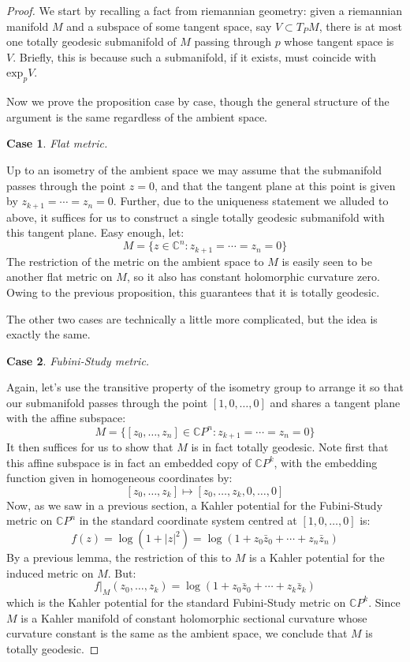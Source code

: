 \documentclass[11pt]{amsart}
\newtheorem{case}{Case}
\theoremstyle{definition}
\def \CP{ \mathbb{C}P }
\def \C{ \mathbb{C} }
\begin{document}
\begin{proof} We start by recalling a fact from riemannian geometry: given a riemannian manifold $M$ and a subspace of some tangent space, say $V \subset T_P M$, there is at most one totally geodesic submanifold of $M$ passing through $p$ whose tangent space is $V$.  Briefly, this is because such a submanifold, if it exists, must coincide with $ \text{exp}_p V $.  

Now we prove the proposition case by case, though the general structure of the argument is the same regardless of the ambient space.

\begin{case} Flat metric.
\end{case}
%
Up to an isometry of the ambient space we may assume that the submanifold passes through the point $z=0$, and that the tangent plane at this point is given by $z_{k+1} = \cdots = z_n = 0$.  Further, due to the uniqueness statement we alluded to above, it suffices for us to construct a single totally geodesic submanifold with this tangent plane.  Easy enough, let:
%
$$M = \{ z \in \C^n : z_{k+1} = \cdots = z_n = 0 \}$$
%
The restriction of the metric on the ambient space to $M$ is easily seen to be another flat metric on $M$, so it also has constant holomorphic curvature zero.  Owing to the previous proposition, this guarantees that it is totally geodesic.

The other two cases are technically a little more complicated, but the idea is exactly the same.

\begin{case} Fubini-Study metric.
\end{case}
%
Again, let's use the transitive property of the isometry group to arrange it so that our submanifold passes through the point $[1,0,\ldots,0]$ and shares a tangent plane with the affine subspace:
%
$$ M = \{ [z_0, \ldots, z_n] \in \CP^n : z_{k+1} = \cdots = z_n = 0 \} $$
%
It then suffices for us to show that $M$ is in fact totally geodesic.  Note first that this affine subspace is in fact an embedded copy of $\CP^k$, with the embedding function given in homogeneous coordinates by:
%
$$ [z_0, \ldots, z_k ] \mapsto [ z_0, \ldots, z_k, 0, \ldots, 0] $$
%
Now, as we saw in a previous section, a Kahler potential for the Fubini-Study metric on $\CP^n$ in the standard coordinate system centred at  $[1,0,\ldots,0]$ is:
%
$$ f(z) = \log( 1 + |z|^2 ) = \log( 1 + z_0 \bar{z}_0 + \cdots + z_n \bar{z}_n ) $$
%
By a previous lemma, the restriction of this to  $M$ is a Kahler potential for the induced metric on $M$.  But:
%
$$ f|_{M} (z_0, \ldots, z_k ) = \log ( 1 + z_0 \bar{z}_0 + \cdots + z_k \bar{z}_k ) $$
%
which is the Kahler potential for the standard Fubini-Study metric on $\CP^k$.  Since $M$ is a Kahler manifold of constant holomorphic sectional curvature whose curvature constant is the same as the ambient space, we conclude that $M$ is totally geodesic.


\end{proof}
\end{document}
